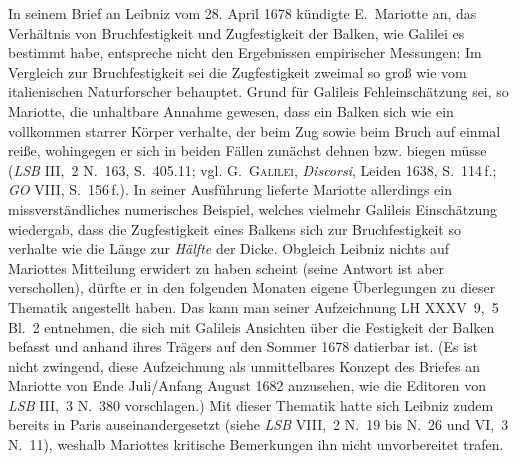 %
%
%
%
%
\frenchspacing%
%
\footnotesize%
\pstart%
\noindent%
\label{AE_1684_319-325_intro_jecg}%
%
In seinem Brief an Leibniz vom 28. April 1678 kündigte E.~Mariotte\protect{} an, das Verhältnis von Bruchfestigkeit und Zugfestigkeit der Balken, wie Galilei\protect{} es %
bestimmt habe, entspreche nicht den Ergebnissen empirischer Messungen:
Im Vergleich zur Bruchfestigkeit sei die Zugfestigkeit zweimal so groß wie vom italienischen Naturforscher behauptet.
Grund für Galileis Fehleinschätzung sei, so Mariotte, die unhaltbare Annahme gewesen, dass ein Balken sich wie ein vollkommen starrer Körper verhalte, der beim Zug sowie beim Bruch auf einmal reiße, wohingegen er sich in beiden Fällen zunächst dehnen bzw. biegen müsse (\textit{LSB} III,~2 N.~163, S.~405.11\cite{01232}; vgl. G.~\textsc{Galilei}, \cite{00050}\textit{Discorsi}, Leiden 1638, S.~114\,f.;\cite{00050} \textit{GO} VIII, S.~156\,f.\cite{00048}).
In seiner Ausführung lieferte Mariotte allerdings ein missverständliches numerisches Beispiel, welches vielmehr Galileis Einschätzung wiedergab, dass die Zugfestigkeit eines Balkens sich zur Bruchfestigkeit so verhalte wie die Länge zur \textit{Hälfte} der Dicke.
\pend%
\pstart%
Obgleich Leibniz nichts auf Mariottes Mitteilung erwidert zu haben scheint (seine Antwort ist aber verschollen), dürfte er in den folgenden Monaten eigene Überlegungen zu dieser Thematik angestellt haben.
Das kann man seiner Aufzeichnung LH XXXV~9,~5 Bl.~2 entnehmen, die sich mit Galileis Ansichten über die Festigkeit der Balken befasst und anhand ihres Trägers auf den Sommer 1678 datierbar ist.
(Es ist nicht zwingend, diese Aufzeichnung als unmittelbares Konzept des Briefes an Mariotte von Ende Juli/Anfang August 1682 anzusehen, wie die Editoren von \textit{LSB} III,~3 N.~380\cite{01263} vorschlagen.)
Mit dieser Thematik hatte sich Leibniz zudem bereits in Paris auseinandergesetzt (siehe \textit{LSB} VIII,~2 N.~19\cite{01249}\cite{01250}\cite{01251}\cite{01252} bis N.~26\cite{01253}\cite{01254}\cite{01255}\cite{01256} und VI,~3 N.~11\cite{00260}), weshalb Mariottes kritische Bemerkungen ihn nicht unvorbereitet trafen.
